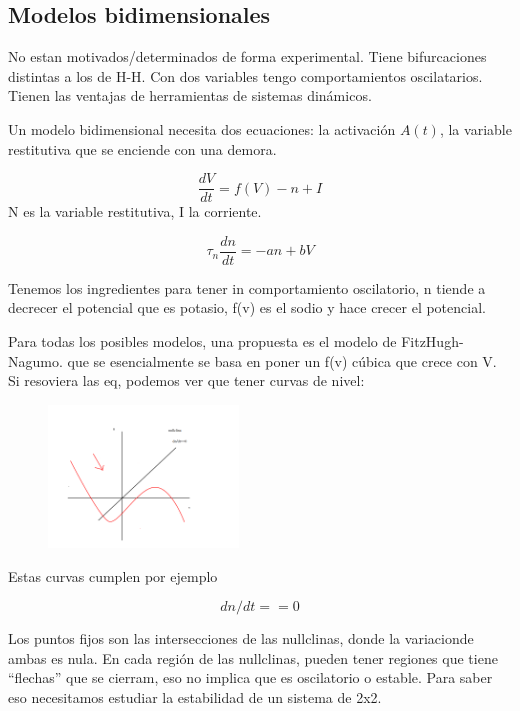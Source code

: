 \subsection{Modelos bidimensionales}

No estan motivados/determinados de forma experimental. Tiene bifurcaciones distintas a los de H-H. Con dos variables tengo comportamientos oscilatarios. Tienen las ventajas de herramientas de sistemas dinámicos. 

Un modelo bidimensional necesita dos ecuaciones: la activación $A(t)$, la variable restitutiva que se enciende con una demora.

\begin{equation}
	\frac{dV}{dt} = f(V) -n + I
\end{equation}
N es la variable restitutiva, I la corriente.

\begin{equation}
	\tau_n \frac{dn}{dt}= -an + bV
\end{equation}

Tenemos los ingredientes para tener in comportamiento oscilatorio, n tiende a decrecer el potencial que es potasio, f(v) es el sodio y hace crecer el potencial. 

Para todas los posibles modelos, una propuesta es el modelo de FitzHugh-Nagumo. que se esencialmente se basa en poner un f(v) cúbica que crece con  V. Si resoviera las eq, podemos ver que tener curvas de nivel:

\begin{figure}[htbp]
	\centering
	\includegraphics[width=0.45\textwidth]{1.png}
\end{figure}
Estas curvas cumplen por ejemplo

\begin{equation}
	dn/dt ==0 
\end{equation}

Los puntos fijos son las intersecciones de las nullclinas, donde la variacionde ambas es nula. En cada región de las nullclinas, pueden tener regiones que tiene ``flechas'' que se cierram, eso no implica que es oscilatorio o estable. Para saber eso necesitamos estudiar la estabilidad de un sistema de 2x2. 

